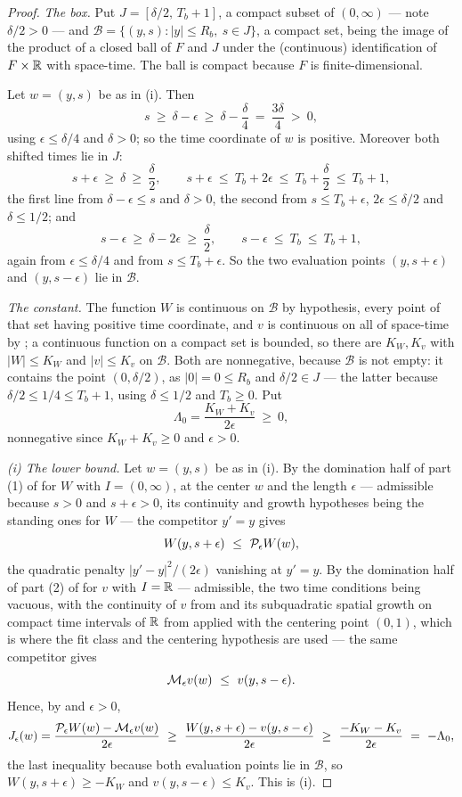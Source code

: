 \begin{proof}
\emph{The box.} Put $J=[\delta/2,\,T_b+1]$, a compact subset of $(0,\infty)$
--- note $\delta/2>0$ --- and
$\mathcal B=\{(y,s):|y|\le R_b,\ s\in J\}$, a compact set, being the image of
the product of a closed ball of $F$ and $J$ under the (continuous)
identification of $F\times\mathbb{R}$ with space-time. The ball is compact because $F$
is finite-dimensional.

Let $w=(y,s)$ be as in (i). Then
\[
  s\ \ge\ \delta-\epsilon\ \ge\ \delta-\frac\delta4\ =\ \frac{3\delta}{4}\ >\ 0 ,
\]
using $\epsilon\le\delta/4$ and $\delta>0$; so the time coordinate of $w$ is
positive. Moreover both shifted times lie in $J$:
\[
  s+\epsilon\ \ge\ \delta\ \ge\ \frac\delta2,
  \qquad
  s+\epsilon\ \le\ T_b+2\epsilon\ \le\ T_b+\frac\delta2\ \le\ T_b+1 ,
\]
the first line from $\delta-\epsilon\le s$ and $\delta>0$, the second from
$s\le T_b+\epsilon$, $2\epsilon\le\delta/2$ and $\delta\le1/2$; and
\[
  s-\epsilon\ \ge\ \delta-2\epsilon\ \ge\ \frac\delta2,
  \qquad
  s-\epsilon\ \le\ T_b\ \le\ T_b+1 ,
\]
again from $\epsilon\le\delta/4$ and from $s\le T_b+\epsilon$. So the two
evaluation points $(y,s+\epsilon)$ and $(y,s-\epsilon)$ lie in $\mathcal B$.

\emph{The constant.} The function $W$ is continuous on $\mathcal B$ by
hypothesis, every point of that set having positive time coordinate, and $v$ is
continuous on all of space-time by ; a continuous function
on a compact set is bounded, so there are $K_W,K_v$ with $|W|\le K_W$ and
$|v|\le K_v$ on $\mathcal B$. Both are nonnegative, because $\mathcal B$ is not
empty: it contains the point $(0,\delta/2)$, as $|0|=0\le R_b$ and
$\delta/2\in J$ --- the latter because $\delta/2\le1/4\le T_b+1$, using
$\delta\le1/2$ and $T_b\ge0$. Put
\[
  \Lambda_0=\frac{K_W+K_v}{2\epsilon}\ \ge\ 0 ,
\]
nonnegative since $K_W+K_v\ge0$ and $\epsilon>0$.

\emph{(i) The lower bound.} Let $w=(y,s)$ be as in (i). By the domination half
of part (1) of  for $W$ with $I=(0,\infty)$,
at the center $w$ and the length $\epsilon$ --- admissible because $s>0$ and
$s+\epsilon>0$, its continuity and growth hypotheses being the standing ones
for $W$ --- the competitor $y'=y$ gives
\[
  W(y,s+\epsilon)\ \le\ \mathcal{P}_\epsilon W(w),
\]
the quadratic penalty $|y'-y|^2/(2\epsilon)$ vanishing at $y'=y$. By the
domination half of part (2) of  for $v$ with
$I=\mathbb{R}$ --- admissible, the two time conditions being vacuous, with the
continuity of $v$ from  and its subquadratic spatial growth
on compact time intervals of $\mathbb{R}$ from  applied
with the centering point $(0,1)$, which is where the fit class and the
centering hypothesis are used --- the same competitor gives
\[
  \Menv_\epsilon v(w)\ \le\ v(y,s-\epsilon).
\]
Hence, by  and $\epsilon>0$,
\[
  J_\epsilon(w)=\frac{\mathcal{P}_\epsilon W(w)-\mathcal{M}_\epsilon v(w)}{2\epsilon}
   \ \ge\ \frac{W(y,s+\epsilon)-v(y,s-\epsilon)}{2\epsilon}
   \ \ge\ \frac{-K_W-K_v}{2\epsilon}
   \ =\ -\Lambda_0 ,
\]
the last inequality because both evaluation points lie in $\mathcal B$, so
$W(y,s+\epsilon)\ge-K_W$ and $v(y,s-\epsilon)\le K_v$. This is (i).


\end{proof}
